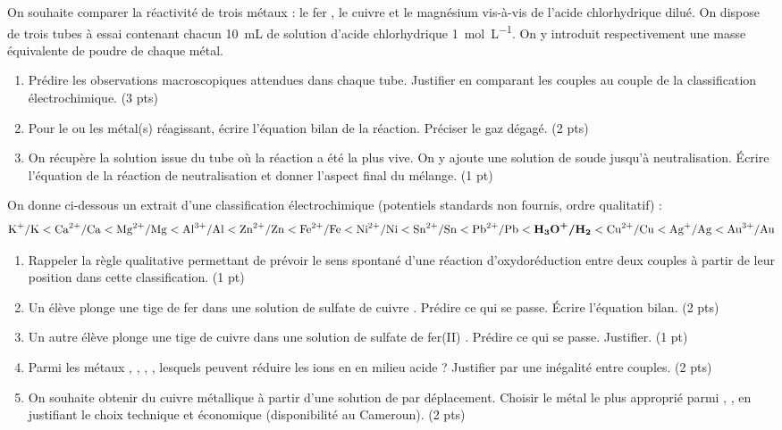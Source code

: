\documentclass[11pt]{article}
\begin{document}
\begin{exercice}
On souhaite comparer la réactivité de trois métaux : le fer , le cuivre  et le magnésium  vis-à-vis de l'acide chlorhydrique dilué. On dispose de trois tubes à essai contenant chacun \SI{10}{mL} de solution d'acide chlorhydrique  \SI{1}{mol.L^{-1}}. On y introduit respectivement une masse équivalente de poudre de chaque métal.
\begin{enumerate}
    \item Prédire les observations macroscopiques attendues dans chaque tube. Justifier en comparant les couples  au couple  de la classification électrochimique. (3 pts)
    \item Pour le ou les métal(s) réagissant, écrire l'équation bilan de la réaction. Préciser le gaz dégagé. (2 pts)
    \item On récupère la solution issue du tube où la réaction a été la plus vive. On y ajoute une solution de soude  jusqu'à neutralisation. Écrire l'équation de la réaction de neutralisation et donner l'aspect final du mélange. (1 pt)
\end{enumerate}
\end{exercice}

\begin{exercice}
On donne ci-dessous un extrait d'une classification électrochimique (potentiels standards non fournis, ordre qualitatif) :
\[
\ce{K+/K} < \ce{Ca^{2+}/Ca} < \ce{Mg^{2+}/Mg} < \ce{Al^{3+}/Al} < \ce{Zn^{2+}/Zn} < \ce{Fe^{2+}/Fe} < \ce{Ni^{2+}/Ni} < \ce{Sn^{2+}/Sn} < \ce{Pb^{2+}/Pb} < \textbf{\ce{H3O+/H2}} < \ce{Cu^{2+}/Cu} < \ce{Ag+/Ag} < \ce{Au^{3+}/Au}
\]
\begin{enumerate}
    \item Rappeler la règle qualitative permettant de prévoir le sens spontané d'une réaction d'oxydoréduction entre deux couples à partir de leur position dans cette classification. (1 pt)
    \item Un élève plonge une tige de fer dans une solution de sulfate de cuivre . Prédire ce qui se passe. Écrire l'équation bilan. (2 pts)
    \item Un autre élève plonge une tige de cuivre dans une solution de sulfate de fer(II) . Prédire ce qui se passe. Justifier. (1 pt)
    \item Parmi les métaux , , , , lesquels peuvent réduire les ions  en  en milieu acide ? Justifier par une inégalité entre couples. (2 pts)
    \item On souhaite obtenir du cuivre métallique à partir d'une solution de  par déplacement. Choisir le métal le plus approprié parmi , ,  en justifiant le choix technique et économique (disponibilité au Cameroun). (2 pts)
\end{enumerate}
\end{exercice}
\end{document}
